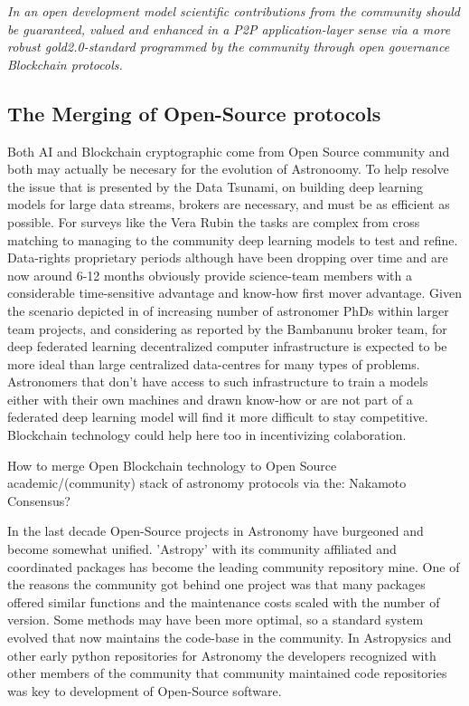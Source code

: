 \documentclass[final,5p,times,twocolumn,authoryear]{elsarticle}
\begin{document}
\emph{In an open development model scientific contributions from the community should be guaranteed, valued and enhanced in a P2P application-layer sense via a more robust gold2.0-standard programmed by the community through open governance Blockchain protocols.}


\subsection{The Merging of Open-Source protocols}

Both AI and Blockchain cryptographic come from Open Source community and both may actually be necesary for the evolution of Astronoomy. To help resolve the issue that is presented by the Data Tsunami, on building deep learning models for large data streams, brokers are necessary, and must be as efficient as possible. For surveys like the Vera Rubin the tasks are complex from cross matching to managing to the community deep learning models to test and refine. Data-rights proprietary periods although have been dropping over time and are now around 6-12 months obviously provide science-team members with a considerable time-sensitive advantage and know-how first mover advantage.  Given the scenario depicted in \label{btc2:sec:sub:half} of increasing number of astronomer PhDs within larger team projects, and considering as reported by the Bambanunu broker team, for deep federated learning decentralized computer infrastructure is expected to be more ideal than large centralized data-centres for many types of problems.  Astronomers that don't have access to such infrastructure to train a models either with their own machines and drawn know-how or are not part of a federated deep learning model will find it more difficult to stay competitive. Blockchain technology could help here too in incentivizing colaboration.   

How to merge Open Blockchain technology to Open Source academic/(community) stack of astronomy protocols via the: Nakamoto Consensus?

In the last decade Open-Source projects in Astronomy have burgeoned and become somewhat unified. 'Astropy' with its community affiliated and coordinated packages has become the leading community repository mine.  One of the reasons the community got behind one project was that many packages offered similar functions and the maintenance costs scaled with the number of version. Some methods may have been more optimal, so a standard system evolved that now maintains the code-base in the community. In Astropysics and other early python repositories for Astronomy the developers recognized with other members of the community that community maintained code repositories was key to development of Open-Source software.
\end{document}
